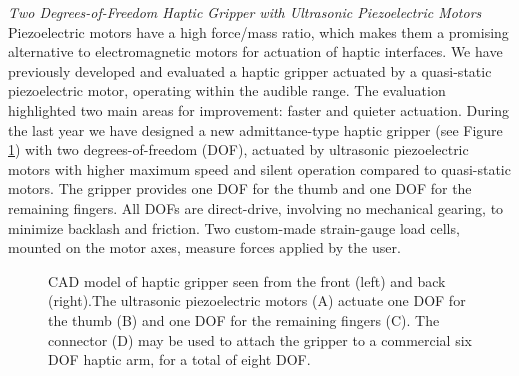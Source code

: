 \begin{enumerate}
{\textit{Two Degrees-of-Freedom Haptic Gripper with Ultrasonic Piezoelectric Motors} Piezoelectric motors have a high force/mass ratio, which makes them a promising alternative to electromagnetic motors for actuation of haptic interfaces. We have previously developed and evaluated a haptic gripper actuated by a quasi-static piezoelectric motor, operating within the audible range. The evaluation highlighted two main areas for improvement: faster and quieter actuation. During the last year we have designed a new admittance-type haptic gripper (see Figure \ref{fig:haptic1}) with two degrees-of-freedom (DOF), actuated by ultrasonic piezoelectric motors with higher maximum speed and silent operation compared to quasi-static motors. The gripper provides one DOF for the thumb and one DOF for the remaining fingers. All DOFs are direct-drive, involving no mechanical gearing, to minimize backlash and friction. Two custom-made strain-gauge load cells, mounted on the motor axes, measure forces applied by the user.

\begin{figure}[!h]
\centering
{}
\caption{\label{fig:haptic1} CAD model of haptic gripper seen from the front (left) and back (right).The ultrasonic piezoelectric motors (A) actuate one DOF for the thumb (B) and one DOF for the remaining fingers (C). The connector (D) may be used to attach the gripper to a commercial six DOF haptic arm, for a total of eight DOF.} 
\end{figure}

}
\end{enumerate}
